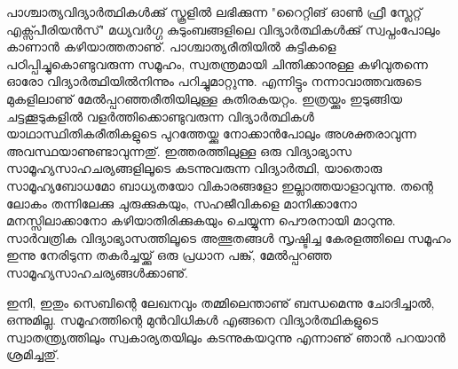 പാശ്ചാത്യവിദ്യാര്‍ത്ഥികള്‍ക്കു് സ്കൂളില്‍ ലഭിക്കുന്ന "റൈറ്റിങ് ഓണ്‍ ഫ്രീ സ്ലേറ്റ് എക്സ്പീരിയന്‍സ്" മധ്യവര്‍ഗ്ഗ കുടുംബങ്ങളിലെ വിദ്യാര്‍ത്ഥികള്‍ക്കു് സ്വപ്നംപോലും കാണാന്‍ കഴിയാത്തതാണു്. പാശ്ചാത്യരീതിയില്‍ കുട്ടികളെ പഠിപ്പിച്ചുകൊണ്ടുവരുന്ന സമൂഹം, സ്വതന്ത്രമായി ചിന്തിക്കാനുള്ള കഴിവുതന്നെ ഓരോ വിദ്യാര്‍ത്ഥിയില്‍നിന്നും പറിച്ചുമാറ്റുന്നു. എന്നിട്ടും നന്നാവാത്തവരുടെ മുകളിലാണു് മേല്‍പ്പറഞ്ഞരീതിയിലുള്ള കുതിരകയറ്റം. ഇത്രയ്ക്കും ഇടുങ്ങിയ ചട്ടക്കൂടുകളില്‍ വളര്‍ത്തിക്കൊണ്ടുവരുന്ന വിദ്യാര്‍ത്ഥികള്‍ യാഥാസ്ഥിതികരീതികളുടെ പുറത്തേയ്ക്കു നോക്കാന്‍പോലും അശക്തരാവുന്ന അവസ്ഥയാണുണ്ടാവുന്നതു്. ഇത്തരത്തിലുള്ള ഒരു വിദ്യാഭ്യാസ സാമൂഹ്യസാഹചര്യങ്ങളിലൂടെ കടന്നുവരുന്ന വിദ്യാര്‍ത്ഥി, യാതൊരു സാമൂഹ്യബോധമോ ബാധ്യതയോ വികാരങ്ങളോ ഇല്ലാത്തയാളാവുന്നു. തന്റെ ലോകം തന്നിലേക്കു ചുരുക്കുകയും, സഹജീവികളെ മാനിക്കാനോ മനസ്സിലാക്കാനോ കഴിയാതിരിക്കുകയും ചെയ്യുന്ന പൌരനായി മാറുന്നു. സാര്‍വത്രിക വിദ്യാഭ്യാസത്തിലൂടെ അത്ഭുതങ്ങള്‍ സൃഷ്ടിച്ച കേരളത്തിലെ സമൂഹം ഇന്നു നേരിടുന്ന തകര്‍ച്ചയ്ക്കു് ഒരു പ്രധാന പങ്കു്, മേല്‍പ്പറഞ്ഞ സാമൂഹ്യസാഹചര്യങ്ങള്‍ക്കാണു്.

ഇനി, ഇതും സെബിന്റെ ലേഖനവും തമ്മിലെന്താണു് ബന്ധമെന്നു ചോദിച്ചാല്‍, ഒന്നുമില്ല. സമൂഹത്തിന്റെ മുന്‍വിധികള്‍ എങ്ങനെ വിദ്യാര്‍ത്ഥികളുടെ സ്വാതന്ത്ര്യത്തിലും സ്വകാര്യതയിലും കടന്നുകയറുന്നു എന്നാണു് ഞാന്‍ പറയാന്‍ ശ്രമിച്ചതു്.

\newpage
